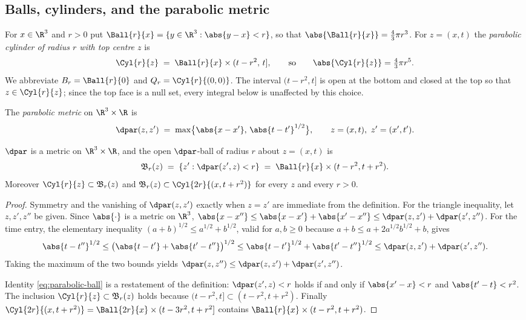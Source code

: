 \documentclass[11pt,reqno]{amsart}
\begin{document}
\subsection{Balls, cylinders, and the parabolic metric}\label{ss:cylinders}

For $x\in\R^{3}$ and $r>0$ put $\Ball{r}{x}=\{y\in\R^{3}:\abs{y-x}<r\}$, so that
$\abs{\Ball{r}{x}}=\tfrac{4}{3}\pi r^{3}$. For $z=(x,t)$ the
\emph{parabolic cylinder of radius $r$ with top centre $z$} is
\begin{equation}\label{eq:cylinder}
  \Cyl{r}{z} \;=\; \Ball{r}{x}\times(t-r^{2},\,t],
  \qquad\text{so}\qquad
  \abs{\Cyl{r}{z}}=\tfrac{4}{3}\pi r^{5}.
\end{equation}
We abbreviate $B_{r}=\Ball{r}{0}$ and $Q_{r}=\Cyl{r}{(0,0)}$. The interval
$(t-r^{2},t]$ is open at the bottom and closed at the top so that $z\in\Cyl{r}{z}$; since the top
face is a null set, every integral below is unaffected by this choice.

The \emph{parabolic metric} on $\R^{3}\times\R$ is
\begin{equation}\label{eq:parabolic-metric}
  \dpar(z,z') \;=\; \max\bigl\{\abs{x-x'},\,\abs{t-t'}^{1/2}\bigr\},
  \qquad z=(x,t),\ z'=(x',t').
\end{equation}

\begin{lemma}\label{lem:parabolic-metric}
$\dpar$ is a metric on $\R^{3}\times\R$, and the open $\dpar$-ball of radius $r$
about $z=(x,t)$ is
\begin{equation}\label{eq:parabolic-ball}
  \mathfrak{B}_{r}(z)
  \;=\;\{z':\dpar(z',z)<r\}
  \;=\;\Ball{r}{x}\times(t-r^{2},t+r^{2}).
\end{equation}
Moreover $\Cyl{r}{z}\subset\mathfrak{B}_{r}(z)$ and
$\mathfrak{B}_{r}(z)\subset \Cyl{2r}{(x,t+r^{2})}$ for every $z$ and every
$r>0$.
\end{lemma}

\begin{proof}
Symmetry and the vanishing of $\dpar(z,z')$ exactly when $z=z'$ are immediate
from the definition. For the triangle inequality, let $z,z',z''$ be given. Since
$\abs{\cdot}$ is a metric on $\R^{3}$,
$\abs{x-x''}\le\abs{x-x'}+\abs{x'-x''}\le\dpar(z,z')+\dpar(z',z'')$. For the
time entry, the elementary inequality $(a+b)^{1/2}\le a^{1/2}+b^{1/2}$, valid
for $a,b\ge0$ because $a+b\le a+2a^{1/2}b^{1/2}+b$, gives
\[
  \abs{t-t''}^{1/2}\le\bigl(\abs{t-t'}+\abs{t'-t''}\bigr)^{1/2}
  \le\abs{t-t'}^{1/2}+\abs{t'-t''}^{1/2}
  \le\dpar(z,z')+\dpar(z',z'').
\]
Taking the maximum of the two bounds yields
$\dpar(z,z'')\le\dpar(z,z')+\dpar(z',z'')$.

Identity \eqref{eq:parabolic-ball} is a restatement of the definition:
$\dpar(z',z)<r$ holds if and only if $\abs{x'-x}<r$ and $\abs{t'-t}<r^{2}$. The
inclusion $\Cyl{r}{z}\subset\mathfrak{B}_{r}(z)$ holds because
$(t-r^{2},t]\subset(t-r^{2},t+r^{2})$. Finally
$\Cyl{2r}{(x,t+r^{2})}=\Ball{2r}{x}\times(t-3r^{2},t+r^{2}]$ contains
$\Ball{r}{x}\times(t-r^{2},t+r^{2})$.
\end{proof}
\end{document}
